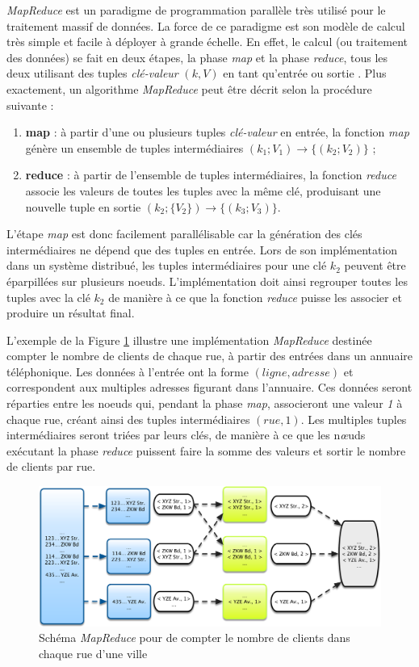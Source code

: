 \textit{MapReduce} \cite{Dean2008} est un paradigme de programmation parallèle très utilisé pour le traitement massif de données. La force de ce paradigme est son modèle de calcul très simple et facile à déployer à grande échelle. En effet, le calcul (ou traitement des données) se fait en deux étapes, la phase \textit{map} et la phase \textit{reduce}, tous les deux utilisant des tuples \textit{clé-valeur} $(k,V)$ en tant qu'entrée ou sortie \cite{White2010}. Plus exactement, un algorithme \textit{MapReduce} peut être décrit selon la procédure suivante : 
\begin{enumerate}
	\item \textbf{map} : à partir d'une ou plusieurs tuples \textit{clé-valeur} en entrée, la fonction \textit{map} génère un ensemble de tuples intermédiaires $(k_1;V_1)\rightarrow\{(k_2;V_2)\}$ ; 
	\item \textbf{reduce} : à partir de l'ensemble de tuples intermédiaires, la fonction \textit{reduce} associe les valeurs de toutes les tuples avec la même clé, produisant une nouvelle tuple en sortie $(k_2;\{V_2\})\rightarrow\{(k_3;V_3)\}$. 
\end{enumerate}

L'étape \textit{map} est donc facilement parallélisable car la génération des clés intermédiaires ne dépend que des tuples en entrée. Lors de son implémentation dans un système distribué, les tuples intermédiaires pour une clé $k_2$ peuvent être éparpillées sur plusieurs noeuds. L'implémentation doit ainsi regrouper toutes les tuples avec la clé $k_2$ de manière à ce que la fonction \textit{reduce} puisse les associer et produire un résultat final. 

L'exemple de la Figure \ref{fig:annuaire} illustre une implémentation \textit{MapReduce} destinée compter le nombre de clients de chaque rue, à partir des entrées dans un annuaire téléphonique. Les données à l'entrée ont la forme $(ligne, adresse)$ et correspondent aux multiples adresses figurant dans l'annuaire. Ces données seront réparties entre les noeuds qui, pendant la phase \textit{map}, associeront une valeur \textit{1} à chaque rue, créant ainsi des tuples intermédiaires $(rue, 1)$. Les multiples tuples intermédiaires seront triées par leurs clés, de manière à ce que les n\textit{\oe}uds exécutant la phase \textit{reduce} puissent faire la somme des valeurs et sortir le nombre de clients par rue.

\begin{figure}[!ht]
	\centering
	\includegraphics[width=0.85\linewidth]{img/exempleAnuaire}
	\caption{Schéma \textit{MapReduce} pour de compter le nombre de clients dans chaque rue d'une ville}
	\label{fig:annuaire}
\end{figure}

